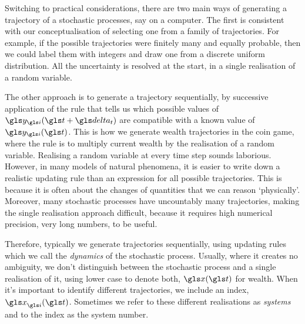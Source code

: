 Switching to practical considerations, there are two main ways of generating a trajectory of a stochastic processes, say on a computer. The first is consistent with our conceptualisation of selecting one from a family of trajectories. For example, if the possible trajectories were finitely many and equally probable, then we could label them with integers and draw one from a discrete uniform distribution. All the uncertainty is resolved at the start, in a single realisation of a random variable.

The other approach is to generate a trajectory sequentially, by successive application of the rule that tells us which possible values of $\y_\gi(\t+\dt)$ are compatible with a known value of $\y_\gi(\t)$. This is how we generate wealth trajectories in the coin game, where the rule is to multiply current wealth by the realisation of a random variable. Realising a random variable at every time step sounds laborious. However, in many models of natural phenomena, it is easier to write down a realistic updating rule than an expression for all possible trajectories. This is because it is often about the changes of quantities that we can reason `physically'. Moreover, many stochastic processes have uncountably many trajectories, making the single realisation approach difficult, because it requires high numerical precision, \ie very long numbers, to be useful.

Therefore, typically we generate trajectories sequentially, using updating rules which we call the \textit{dynamics} of the stochastic process. Usually, where it creates no ambiguity, we don't distinguish between the stochastic process and a single realisation of it, using lower case to denote both, \eg $\x(\t)$ for wealth. When it's important to identify different trajectories, we include an index, \eg $\x_\gi(\t)$. Sometimes we refer to these different realisations as \textit{systems} and to the index as the system number.

